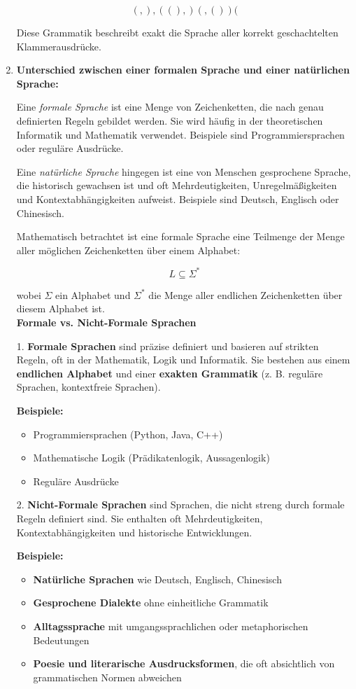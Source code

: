 \documentclass[a4paper,12pt]{article}
\begin{document}
\begin{enumerate}
	\[
	(, ), ((), )(, ())(
	\]
	
	Diese Grammatik beschreibt exakt die Sprache aller korrekt geschachtelten Klammerausdrücke.
	
	
		\item \textbf{Unterschied zwischen einer formalen Sprache und einer natürlichen Sprache:}
	
	Eine \emph{formale Sprache} ist eine Menge von Zeichenketten, die nach genau definierten Regeln gebildet werden. Sie wird häufig in der theoretischen Informatik und Mathematik verwendet. Beispiele sind Programmiersprachen oder reguläre Ausdrücke.
	
	Eine \emph{natürliche Sprache} hingegen ist eine von Menschen gesprochene Sprache, die historisch gewachsen ist und oft Mehrdeutigkeiten, Unregelmäßigkeiten und Kontextabhängigkeiten aufweist. Beispiele sind Deutsch, Englisch oder Chinesisch.
	
	Mathematisch betrachtet ist eine formale Sprache eine Teilmenge der Menge aller möglichen Zeichenketten über einem Alphabet:
	
	\[
	L \subseteq \Sigma^*
	\]
	
	wobei \(\Sigma\) ein Alphabet und \(\Sigma^*\) die Menge aller endlichen Zeichenketten über diesem Alphabet ist. \\
	
	
	\textbf{Formale vs. Nicht-Formale Sprachen}
	
	1. \textbf{Formale Sprachen} sind präzise definiert und basieren auf strikten Regeln, oft in der Mathematik, Logik und Informatik. Sie bestehen aus einem \textbf{endlichen Alphabet} und einer \textbf{exakten Grammatik} (z. B. reguläre Sprachen, kontextfreie Sprachen).
	
	\textbf{Beispiele:}
	\begin{itemize}
		\item Programmiersprachen (Python, Java, C++)
		\item Mathematische Logik (Prädikatenlogik, Aussagenlogik)
		\item Reguläre Ausdrücke
\end{itemize}

2. \textbf{Nicht-Formale Sprachen} sind Sprachen, die nicht streng durch formale Regeln definiert sind. Sie enthalten oft Mehrdeutigkeiten, Kontextabhängigkeiten und historische Entwicklungen.

\textbf{Beispiele:}
\begin{itemize}
	\item \textbf{Natürliche Sprachen} wie Deutsch, Englisch, Chinesisch
	\item \textbf{Gesprochene Dialekte} ohne einheitliche Grammatik
	\item \textbf{Alltagssprache} mit umgangssprachlichen oder metaphorischen Bedeutungen
	\item \textbf{Poesie und literarische Ausdrucksformen}, die oft absichtlich von grammatischen Normen abweichen
\end{itemize}


\end{enumerate}
\end{document}
